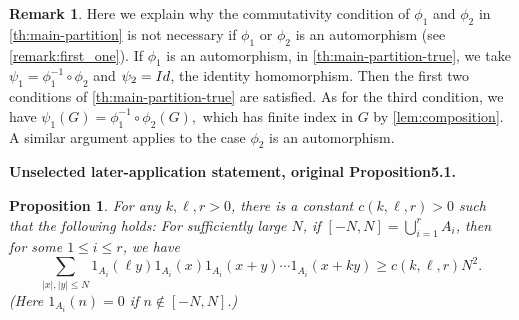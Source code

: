 \documentclass[10pt]{article}
\newtheorem{proposition}[proposition]{Proposition}
\theoremstyle{definition}
\newtheorem{remark}{Remark}
\begin{document}
\begin{remark} \label{rk:auto2}
Here we explain why the commutativity condition of $\phi_1$ and $\phi_2$ in \cref{th:main-partition} is not necessary if $\phi_1$ or $\phi_2$ is an automorphism (see \cref{remark:first_one}). If $\phi_1$ is an automorphism, in \cref{th:main-partition-true}, we take $\psi_1 = \phi_1^{-1} \circ \phi_2$ and $\psi_2 = \textup{Id}$, the identity homomorphism. Then the first two conditions of \cref{th:main-partition-true} are satisfied. As for the third condition, we have $\psi_1(G) = \phi_1^{-1} \circ \phi_2(G),$ which has finite index in $G$ by \cref{lem:composition}. A similar argument applies to the case $\phi_2$ is an automorphism.
\end{remark}
\par\medskip\noindent\textbf{Unselected later-application statement, original Proposition5.1.}\par\setcounter{section}{5}\setcounter{theorem}{0}
\begin{proposition}\label{prop:counting-brauer}
For any $k, \ell, r>0$, there is a constant $c(k, \ell, r) > 0$ such that the following holds: For sufficiently large $N$, if $[-N, N] = \bigcup_{i=1}^r A_i$, then for some $1 \leq i \leq r$, we have
\[
\sum_{|x|, |y| \leq N} 1_{A_i}(\ell y) 1_{A_i}(x) 1_{A_i}(x+y) \cdots 1_{A_i}(x + ky) \geq c(k, \ell, r) N^2.
\]
(Here $1_{A_i}(n) = 0$ if $n \not \in [-N, N]$.)
\end{proposition}
\end{document}
